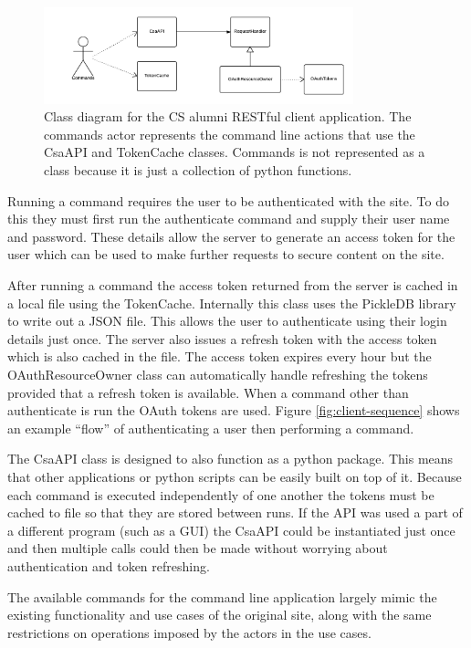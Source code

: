 \documentclass[paper=a4, fontsize=11pt]{scrartcl}	%
\numberwithin{equation}{section}															%
\numberwithin{figure}{section}																%
\numberwithin{table}{section}
\begin{document}
\begin{figure}[H]
\centering
\includegraphics[width=0.8\textwidth]{img/client_class_diagram.png}
\caption{Class diagram for the CS alumni RESTful client application. The commands actor represents the command line actions that use the CsaAPI and TokenCache classes. Commands is not represented as a class because it is just a collection of python functions.}
\label{fig:client-class-diagram}
\end{figure}

Running a command requires the user to be authenticated with the site. To do this they must first run the authenticate command and supply their user name and password. These details allow the server to generate an access token for the user which can be used to make further requests to secure content on the site.

After running a command the access token returned from the server is cached in a local file using the TokenCache. Internally this class uses the PickleDB library \cite{libraryPickledb} to write out a JSON file. This allows the user to authenticate using their login details just once. The server also issues a refresh token with the access token which is also cached in the file. The access token expires every hour but the OAuthResourceOwner class can automatically handle refreshing the tokens provided that a refresh token is available. When a command other than authenticate is run the OAuth tokens are used. Figure \ref{fig:client-sequence} shows an example ``flow'' of authenticating a user then performing a command.

The CsaAPI class is designed to also function as a python package. This means that other applications or python scripts can be easily built on top of it. Because each command is executed independently of one another the tokens must be cached to file so that they are stored between runs. If the API was used a part of a different program (such as a GUI) the CsaAPI could be instantiated just once and then multiple calls could then be made without worrying about authentication and token refreshing.

The available commands for the command line application largely mimic the existing functionality and use cases of the original site, along with the same restrictions on operations imposed by the actors in the use cases.
\end{document}
